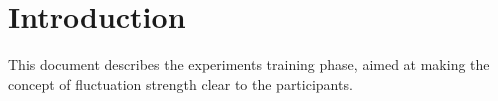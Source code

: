 \documentclass[a4paper]{article}
\begin{document}

\section{Introduction} %
\label{sec:introduction}

This document describes the experiment\textquotesingle s training phase, aimed
at making the concept of fluctuation strength clear to the participants.

\end{document}
